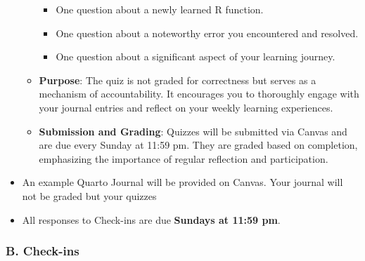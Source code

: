 \documentclass[
  11pt,
  letterpaper,
  DIV=11,
  numbers=noendperiod]{scrartcl}
\providecommand{\tightlist}{%
  \setlength{\itemsep}{0pt}\setlength{\parskip}{0pt}}\usepackage{longtable,booktabs,array}
\begin{document}
\begin{enumerate}
\begin{itemize}
    \begin{itemize}
    \tightlist
    \item
      One question about a newly learned R function.
    \item
      One question about a noteworthy error you encountered and
      resolved.
    \item
      One question about a significant aspect of your learning journey.
    \end{itemize}
  \item
    \textbf{Purpose}: The quiz is not graded for correctness but serves
    as a mechanism of accountability. It encourages you to thoroughly
    engage with your journal entries and reflect on your weekly learning
    experiences.
  \item
    \textbf{Submission and Grading}: Quizzes will be submitted via
    Canvas and are due every Sunday at 11:59 pm. They are graded based
    on completion, emphasizing the importance of regular reflection and
    participation.
  \end{itemize}
\end{enumerate}

\begin{tcolorbox}[enhanced jigsaw, toptitle=1mm, arc=.35mm, toprule=.15mm, colback=white, opacityback=0, coltitle=black, colbacktitle=quarto-callout-tip-color!10!white, colframe=quarto-callout-tip-color-frame, bottomtitle=1mm, opacitybacktitle=0.6, leftrule=.75mm, title=\textcolor{quarto-callout-tip-color}{\faLightbulb}\hspace{0.5em}{Example Journal}, left=2mm, bottomrule=.15mm, breakable, titlerule=0mm, rightrule=.15mm]

\begin{itemize}
\tightlist
\item
  An example Quarto Journal will be provided on Canvas. Your journal
  will not be graded but your quizzes
\end{itemize}

\end{tcolorbox}

\begin{itemize}
\tightlist
\item
  All responses to Check-ins are due \textbf{Sundays at 11:59 pm}.
\end{itemize}

\hypertarget{b.-check-ins}{%
\subsubsection{B. Check-ins}\label{b.-check-ins}}
\end{document}
